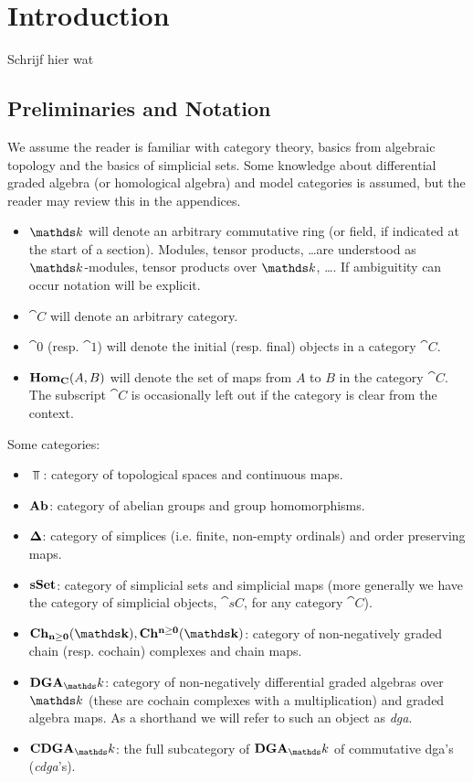 
\chapter{Introduction}

Schrijf hier wat

\section{Preliminaries and Notation}

We assume the reader is familiar with category theory, basics from algebraic topology and the basics of simplicial sets. Some knowledge about differential graded algebra (or homological algebra) and model categories is assumed, but the reader may review this in the appendices.

\begin{itemize}
	\item $\k$ will denote an arbitrary commutative ring (or field, if indicated at the start of a section). Modules, tensor products, \dots are understood as $\k$-modules, tensor products over $\k$, \dots. If ambiguitity can occur notation will be explicit.
	\item $\cat{C}$ will denote an arbitrary category.
	\item $\cat{0}$ (resp. $\cat{1}$) will denote the initial (resp. final) objects in a category $\cat{C}$.
	\item $\mathbf{Hom}_{\mathbf{C}}(A, B)$ will denote the set of maps from $A$ to $B$ in the category $\cat{C}$. The subscript $\cat{C}$ is occasionally left out if the category is clear from the context.
\end{itemize}

Some categories:
\begin{itemize}
	\item $\Top$: category of topological spaces and continuous maps.
	\item $\mathbf{Ab}$: category of abelian groups and group homomorphisms.
	\item $\boldsymbol{\Delta}$: category of simplices (i.e. finite, non-empty ordinals) and order preserving maps.
	\item $\mathbf{s{\mathbf{Set}}}$: category of simplicial sets and simplicial maps (more generally we have the category of simplicial objects, $\cat{sC}$, for any category $\cat{C}$).
	\item $\Ch{\k}, \CoCh{\k}$: category of non-negatively graded chain (resp. cochain) complexes and chain maps.
	\item $\DGA_\k$: category of non-negatively differential graded algebras over $\k$ (these are cochain complexes with a multiplication) and graded algebra  maps. As a shorthand we will refer to such an object as \emph{dga}.
	\item $\CDGA_\k$: the full subcategory of $\DGA_\k$ of commutative dga's (\emph{cdga}'s).
\end{itemize}

\tableofcontents
{}
